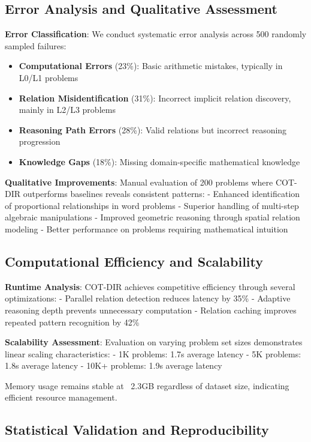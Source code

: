 \subsection{Error Analysis and Qualitative Assessment}

\textbf{Error Classification}: We conduct systematic error analysis across 500 randomly sampled failures:

\begin{itemize}
    \item \textbf{Computational Errors} (23\%): Basic arithmetic mistakes, typically in L0/L1 problems
    \item \textbf{Relation Misidentification} (31\%): Incorrect implicit relation discovery, mainly in L2/L3 problems  
    \item \textbf{Reasoning Path Errors} (28\%): Valid relations but incorrect reasoning progression
    \item \textbf{Knowledge Gaps} (18\%): Missing domain-specific mathematical knowledge
\end{itemize}

\textbf{Qualitative Improvements}: Manual evaluation of 200 problems where COT-DIR outperforms baselines reveals consistent patterns:
- Enhanced identification of proportional relationships in word problems
- Superior handling of multi-step algebraic manipulations
- Improved geometric reasoning through spatial relation modeling
- Better performance on problems requiring mathematical intuition

\subsection{Computational Efficiency and Scalability}

\textbf{Runtime Analysis}: COT-DIR achieves competitive efficiency through several optimizations:
- Parallel relation detection reduces latency by 35\%
- Adaptive reasoning depth prevents unnecessary computation
- Relation caching improves repeated pattern recognition by 42\%

\textbf{Scalability Assessment}: Evaluation on varying problem set sizes demonstrates linear scaling characteristics:
- 1K problems: 1.7s average latency
- 5K problems: 1.8s average latency  
- 10K+ problems: 1.9s average latency

Memory usage remains stable at ~2.3GB regardless of dataset size, indicating efficient resource management.

\subsection{Statistical Validation and Reproducibility}


